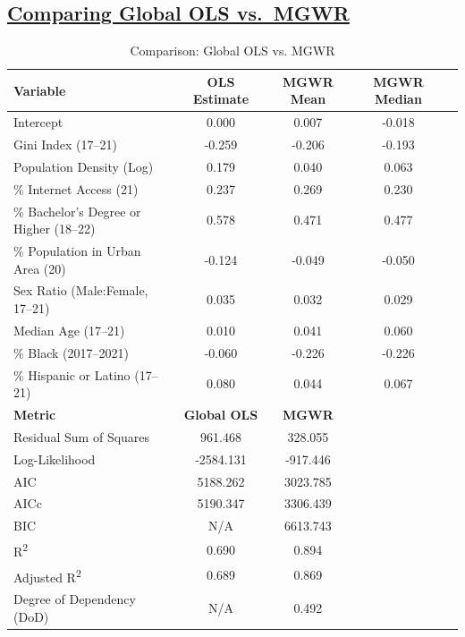 \documentclass[
]{article}
\begin{document}
\newpage

\subsection{\texorpdfstring{\ul{Comparing Global OLS
vs.~MGWR}}{Comparing Global OLS vs.~MGWR}}\label{comparing-global-ols-vs.-mgwr}

\begin{table}[H]
\renewcommand{\arraystretch}{1.3}
\centering
\caption{Comparison: Global OLS vs. MGWR}
\label{tab:ols_vs_mgwr}
\begin{tabular}{lcccc}
\hline
\textbf{Variable} & \textbf{OLS Estimate} & \textbf{MGWR Mean} & \textbf{MGWR Median} \\ \hline
Intercept                & 0.000 & 0.007 & -0.018 \\ 
Gini Index (17–21)       & -0.259 & -0.206 & -0.193 \\ 
Population Density (Log) & 0.179 & 0.040 & 0.063 \\ 
\% Internet Access (21)  & 0.237 & 0.269 & 0.230 \\ 
\% Bachelor's Degree or Higher (18–22) & 0.578 & 0.471 & 0.477 \\ 
\% Population in Urban Area (20) & -0.124 & -0.049 & -0.050 \\ 
Sex Ratio (Male:Female, 17–21) & 0.035 & 0.032 & 0.029 \\ 
Median Age (17–21)       & 0.010 & 0.041 & 0.060 \\ 
\% Black (2017–2021)     & -0.060 & -0.226 & -0.226 \\ 
\% Hispanic or Latino (17–21) & 0.080 & 0.044 & 0.067 \\ \hline
\textbf{Metric} & \textbf{Global OLS} & \textbf{MGWR} \\ \hline
Residual Sum of Squares  & 961.468 & 328.055 \\
Log-Likelihood           & -2584.131 & -917.446 \\
AIC                      & 5188.262 & 3023.785 \\
AICc                     & 5190.347 & 3306.439 \\
BIC                      & N/A & 6613.743 \\
R\textsuperscript{2}     & 0.690 & 0.894 \\
Adjusted R\textsuperscript{2} & 0.689 & 0.869 \\
Degree of Dependency (DoD) & N/A & 0.492 \\ \hline
\end{tabular}
\end{table}
\end{document}
